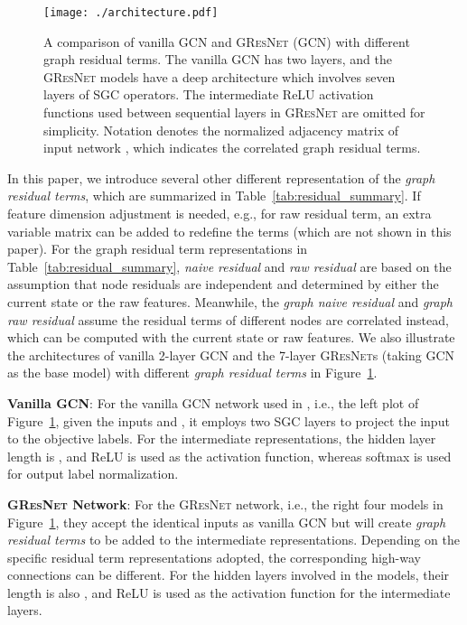 \documentclass{article}
\newcommand{\gresnet}{\textsc{GResNet}}
\newcommand{\gcn}{\textsc{GCN}}
\begin{document}
\begin{figure}[t]
\vspace{-40pt}
    \begin{minipage}{\textwidth}
    \centering
    	\texttt{[image: ./architecture.pdf]}
	\vspace{-25pt}
    	\caption{A comparison of vanilla {\gcn} and {\gresnet} (\gcn) with different graph residual terms. The vanilla {\gcn} has two layers, and the {\gresnet} models have a deep architecture which involves seven layers of SGC operators. The intermediate ReLU activation functions used between sequential layers in {\gresnet} are omitted for simplicity. Notation {\tiny \fbox{}} denotes the normalized adjacency matrix of input network , which indicates the correlated graph residual terms.}
    	\label{fig:architecture}
    \end{minipage}\vspace{-15pt}
\end{figure}


In this paper, we introduce several other different representation of the \textit{graph residual terms}, which are summarized in Table~\ref{tab:residual_summary}. If feature dimension adjustment is needed, e.g., for raw residual term, an extra variable matrix  can be added to redefine the terms (which are not shown in this paper). For the graph residual term representations in Table~\ref{tab:residual_summary}, \textit{naive residual} and \textit{raw residual} are based on the assumption that node residuals are independent and determined by either the current state or the raw features. Meanwhile, the \textit{graph naive residual} and \textit{graph raw residual} assume the residual terms of different nodes are correlated instead, which can be computed with the current state or raw features. We also illustrate the architectures of vanilla 2-layer {\gcn} and the 7-layer {\gresnet}s (taking {\gcn} as the base model) with different \textit{graph residual terms} in Figure~\ref{fig:architecture}.

\textbf{Vanilla {\gcn}}: For the vanilla {\gcn} network used in \cite{KW16}, i.e., the left plot of Figure~\ref{fig:architecture}, given the inputs  and , it employs two SGC layers to project the input to the objective labels. For the intermediate representations, the hidden layer length is , and ReLU is used as the activation function, whereas softmax is used for output label normalization.

\textbf{{\gresnet} Network}: For the {\gresnet} network, i.e., the right four models in Figure~\ref{fig:architecture}, they accept the identical inputs as vanilla {\gcn} but will create \textit{graph residual terms} to be added to the intermediate representations. Depending on the specific residual term representations adopted, the corresponding high-way connections can be different. For the hidden layers involved in the models, their length is also , and ReLU is used as the activation function for the intermediate layers.
\end{document}
